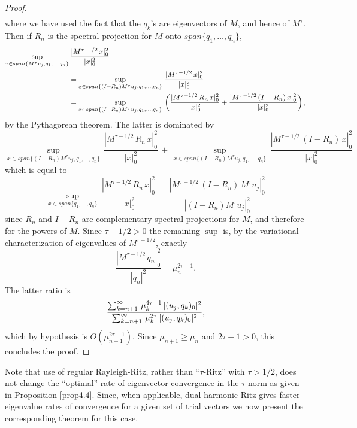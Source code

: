 \documentclass[final]{siamltex}
\numberwithin{equation}{section}
\begin{document}
\begin{proof}
\begin{align}
\end{align}
where we have used the fact that the $q_k$'s are eigenvectors of $M$, and hence of $M^{\tau}$. Then if $R_n$ is the spectral projection for $M$ onto $span\{q_1, \ldots, q_n \}$,
\begin{align}
\sup_{x \in span\{M^{\tau} u_j, q_1, \ldots, q_{n}\}} & \, \frac{|M^{\tau-1/2} \, x|_{0}^2}
{|x|_{0}^2}\notag \\
&=\sup_{x \in span\{(I-R_n) M^{\tau} u_j, q_1, \ldots, q_{n}\}} \, \frac{|M^{\tau-1/2} \, x|_{0}^2}
{|x|_{0}^2}\notag \\
&= \sup_{x \in span\{(I-R_n) M^{\tau} u_j, q_1, \ldots, q_{n}\}} \, \left( \frac{|M^{\tau-1/2} \, R_n \, x|_{0}^2}
{|x|_{0}^2}
+\frac{|M^{\tau-1/2} \, (I-R_n) \, x|_{0}^2}
{|x|_{0}^2}
\right),
\notag
\end{align}
by the Pythagorean theorem. The latter is dominated by
\[\sup_{x \in span\{(I-R_n) M^{\tau} u_j, q_1, \ldots, q_{n}\}} \, \frac{|M^{\tau-1/2} \, R_n \, x|_{0}^2}
{|x|_{0}^2}
\, + \, \sup_{x \in span\{(I-R_n) M^{\tau} u_j, q_1, \ldots, q_{n}\}} \, \frac{|M^{\tau-1/2} \, (I-R_n) \, x|_{0}^2}
{|x|_{0}^2}
\]
which is equal to
\[\sup_{x \in span\{q_1, \ldots, q_{n}\}} \, \frac{|M^{\tau-1/2} \, R_n \, x|_{0}^2}
{|x|_{0}^2}
\, + \, \frac{|M^{\tau-1/2} \, (I-R_n) \, M^{\tau} u_j|_{0}^2}
{|(I-R_n) M^{\tau} u_j|_{0}^2}
\]
since $R_n$ and $I-R_n$ are complementary spectral projections for $M$, and therefore for the powers of $M$. Since $\tau-1/2>0$ the remaining $\sup$ is, by the variational characterization of eigenvalues of $M^{\tau-1/2}$, exactly
\[\frac{|M^{\tau-1/2} \, q_n|_0^2}{|q_n|^2}=\mu_{n}^{2 \tau-1}.\]
The latter ratio is
\begin{equation} \notag
\frac{\sum_{k=n+1}^{\infty}  \, \mu_{k}^{4 \tau-1} \, |(u_j, q_k)_0|^2}
{\sum_{k=n+1}^{\infty}  \, \mu_{k}^{2 \tau} \, |(u_j, q_k)_0|^2},
\end{equation}
which by hypothesis is $O(\mu_{n+1}^{2 \tau-1})$. Since $\mu_{n+1} \ge \mu_{n}$ and $2 \tau-1>0$, this concludes the proof.
\hfill \end{proof}

Note that use of regular Rayleigh-Ritz, rather than ``$\tau$-Ritz'' with $\tau>1/2$, does not change the ``optimal'' rate of eigenvector convergence in the $\tau$-norm as given in Proposition \ref{prop4.4}. Since, when applicable, dual harmonic Ritz gives faster eigenvalue rates of convergence for a given set of trial vectors we now present the corresponding theorem for this case.
\end{document}
